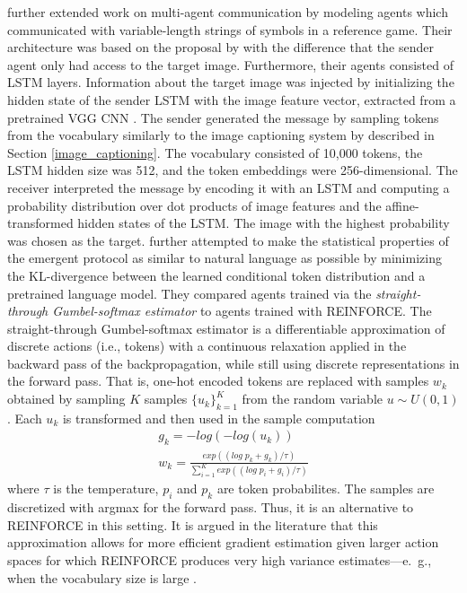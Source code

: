 \cite{havrylov2017emergence} further extended work on multi-agent communication by modeling agents which communicated with variable-length strings of symbols in a reference game. 
Their architecture was based on the proposal by \cite{lazaridou2016multi} with the difference that the sender agent only had access to the target image. Furthermore, their agents consisted of LSTM layers. Information about the target image was injected by initializing the hidden state of the sender LSTM with the image feature vector, extracted from a pretrained VGG CNN \parencite{simonyan2014very}. The sender generated the message by sampling tokens from the vocabulary similarly to the image captioning system by \cite{vinyals2015show} described in Section \ref{image_captioning}. The vocabulary consisted of 10,000 tokens, the LSTM hidden size was 512, and the token embeddings were 256-dimensional. 
The receiver interpreted the message by encoding it with an LSTM and computing a probability distribution over dot products of image features and the affine-transformed hidden states of the LSTM. The image with the highest probability was chosen as the target. \cite{havrylov2017emergence} further attempted to make the statistical properties of the emergent protocol as similar to natural language as possible by minimizing the KL-divergence between the learned conditional token distribution and a pretrained language model.
They compared agents trained via the \textit{straight-through Gumbel-softmax estimator} to agents trained with REINFORCE. The straight-through Gumbel-softmax estimator is a differentiable approximation of discrete actions (i.e., tokens) with a continuous relaxation applied in the backward pass of the backpropagation, while still using discrete representations in the forward pass. 
That is, one-hot encoded tokens are replaced with samples $w_k$ obtained by sampling $K$ samples  $\{u_k\}_{k=1}^K$ from the random variable $u \sim U(0,1)$. Each $u_k$ is transformed and then used in the sample computation
\begin{equation}
\begin{aligned}
g_k = -log(-log(u_k)) \\
w_k = \frac{exp((log \; p_k + g_k) / \tau)}{\sum_{i=1}^{K} exp((log \; p_i + g_i) / \tau)}
\end{aligned}
\end{equation}
where $\tau$ is the temperature, $p_i$ and $p_k$ are token probabilites. The samples are discretized with argmax for the forward pass. Thus, it is an alternative to REINFORCE in this setting.
It is argued in the literature that this approximation allows for more efficient gradient estimation given larger action spaces for which REINFORCE produces very high variance estimates---e.~g., when the vocabulary size is large \parencite{havrylov2017emergence}.

